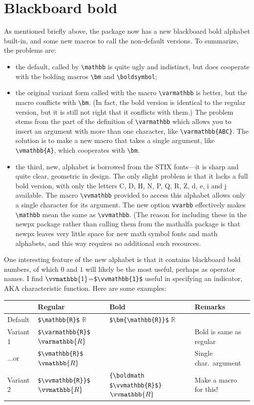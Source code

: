 \documentclass[11pt]{article}
\begin{document}
\section{Blackboard bold}
As mentioned briefly above, the package now has a new blackboard bold alphabet built-in, and some new macros to call the non-default versions. To summarize, the problems are:
\begin{itemize}
\item
the default, called by \verb|\mathbb| is quite ugly and indistinct, but does cooperate with the bolding macros \verb|\bm| and \verb|\boldsymbol|;
\item the original variant form called with the macro \verb|\varmathbb| is better, but the macro conflicts with \verb|\bm|. (In fact, the bold version is identical to the regular version, but it is still not right that it conflicts with them.) The problem stems from the part of the definition of \verb|\varmathbb| which allows you to insert an argument with more than one character, like \verb|\varmathbb{ABC}|. The solution is to make a new macro that takes a single argument, like \verb|\vmathbb{A}|, which cooperates with \verb|\bm|.
\item the third, new, alphabet is borrowed from the STIX fonts---it is sharp and quite clear, geometric in design. The only slight problem is that it lacks a full bold version, with only the letters C, D, H, N, P, Q, R, Z, d, e, i and j available. The macro \verb|\vvmathbb| provided to access this alphabet allows only a single character for its argument. The new option {\tt vvarbb} effectively makes \verb|\mathbb| mean the same as \verb|\vvmathbb|.
(The reason for including these in the \textsf{newpx} package rather than calling them from the \textsf{mathalfa} package is that \textsf{newpx} leaves very little space for new math symbol fonts and math alphabets, and this way requires no additional such resources.
\end{itemize}
One interesting feature of the new alphabet is that it contains blackboard bold numbers, of which $0$ and $1$ will likely be the most useful, perhaps as operator names. I find $\vvmathbb{1}$=\verb|$\vvmathbb{1}$| useful in specifying an indicator, AKA characteristic function. Here are some examples:

\begin{center}
  \begin{tabular}{@{} llll @{}}
    \toprule
     & Regular & Bold & Remarks \\ 
    \midrule
Default  & \verb|$\mathbb{R}$| $\mathbb{R}$& \verb|$\bm{\mathbb{R}}$| $\bm{\mathbb{R}}$\\ 
Variant 1     & \verb|$\varmathbb{R}$| $\varmathbb{R}$ &  & Bold is same as regular \\ 
$\dots$or     & \verb|$\vmathbb{R}$| $\vmathbb{R}$ &  & Single char.\ argument\\ 
Variant 2 & \verb|$\vvmathbb{R}}$| $\vvmathbb{R}$& \verb|{\boldmath $\vvmathbb{R}$}| {\boldmath $\vvmathbb{R}$} & Make a macro for this! \\ 
    \bottomrule
  \end{tabular}
\end{center}
\end{document}
